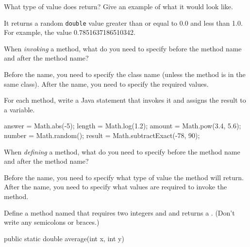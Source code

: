 \Q What type of value does  return? Give an example of what it would look like.

\begin{answer}
It returns a random \texttt{double} value greater than or equal to 0.0 and less than 1.0.
For example, the value 0.7851637186510342.
\end{answer}


\Q When \emph{invoking} a method, what do you need to specify before the method name and after the method name?

\begin{answer}
Before the name, you need to specify the class name (unless the method is in the same class).
After the name, you need to specify the required values.
\end{answer}


\Q For each method, write a Java statement that invokes it and assigns the result to a variable.

\begin{answer}[8em]
\vspace{-1ex}
\begin{javaans}
answer = Math.abs(-5);
length = Math.log(1.2);
amount = Math.pow(3.4, 5.6);
number = Math.random();
result = Math.subtractExact(-78, 90);
\end{javaans}
\end{answer}


\Q When \emph{defining} a method, what do you need to specify before the method name and after the method name?

\begin{answer}
Before the name, you need to specify what type of value the method will return.
After the name, you need to specify what values are required to invoke the method.
\end{answer}


\Q Define a method named  that requires two integers  and  and returns a . (Don't write any semicolons or braces.)

\begin{answer}
\begin{javaans}
public static double average(int x, int y)
\end{javaans}
\end{answer}




